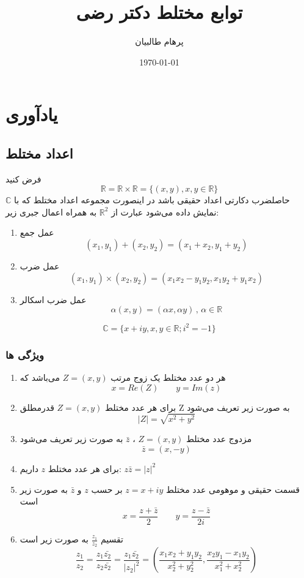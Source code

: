 \documentclass[12pt]{report}
\begin{document}
	
	
	\title{توابع مختلط دکتر رضی}
	\author{پرهام طالبیان}
	\date{\today}
	\maketitle
	

	\tableofcontents
	\chapter{یادآوری}
	
	\section{اعداد مختلط}
	فرض کنید
	$$\mathbb{R} = \mathbb{R} \times \mathbb{R} = \{(x, y), x, y \in \mathbb{R}\}$$
	حاصلضرب دکارتی اعداد حقیقی باشد در اینصورت مجموعه اعداد مختلط که با
	$\mathbb{C}$
	نمایش داده می‌شود عبارت از 
	$\mathbb{R}^2$
	به همراه اعمال جبری زیر:
	\begin{enumerate}
		\item 
		عمل جمع
		$$(x_1,y_1) + (x_2,y_2) = (x_1+x_2, y_1+y_2)$$
		\item
		عمل ضرب
		$$(x_1,y_1) \times (x_2,y_2) = (x_1x_2 - y_1 y_2, x_1y_2+y_1x_2)$$
		\item
		عمل ضرب اسکالر
		$$\alpha(x, y) = (\alpha x , \alpha y) \,,\, \alpha \in \mathbb{R}$$

	\end{enumerate}
	
	$$\mathbb{C} = \{x+iy, x, y \in \mathbb{R} ; i^2 = -1\}$$
	\subsection{ویژگی ها}
	\begin{enumerate}
		\item 
		هر دو عدد مختلط یک زوج مرتب 
		$Z=(x, y)$
		می‌باشد که
		$$x = Re(Z) \qquad y = Im(z)$$
		\item
		برای هر عدد مختلط
		$Z = (x, y)$
		قدرمطلق Z به صورت زیر تعریف می‌شود
		$$|Z| = \sqrt{x^2+y^2}$$
		\item
		مزدوج عدد مختلط 
		$Z=(x, y)$
		،
		$\bar{z}$
		به صورت زیر تعریف می‌شود
		$$\bar{z} =(x, -y)$$
		\item
		برای هر عدد مختلط  
		$z$
		داریم:
		$z \bar{z} = |z|^2\qquad$
		\item
		قسمت حقیقی و موهومی عدد مختلط
		$z = x+iy$
		بر حسب 
		$z$
		و
		$\bar{z}$
		به صورت زیر است
		$$x=\frac{z+\bar{z}}{2} \qquad y=\frac{z - \bar{z}}{2i}$$
		\item
		تقسیم
		$\frac{z_1}{z_2}$
		به صورت زیر است
		$$\frac{z_1}{z_2} = \frac{z_1\bar{z_2}}{z_2\bar{z_2}} = \frac{z_1\bar{z_2}}{|z_2|^2} = (\frac{x_1x_2+y_1y_2}{x_2^2+y_2^2}, \frac{x_2y_1 - x_1y_2}{x_1^2+x_2^2})$$
	\end{enumerate}
	
\end{document}
